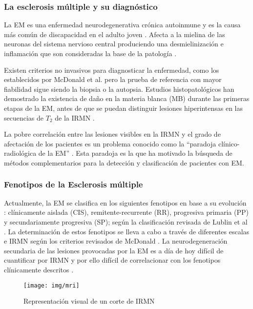 \documentclass[fleqn,12pt]{uicarticle} %
\begin{document}
\subsubsection{La esclerosis múltiple y su diagnóstico}

La EM es una enfermedad neurodegenerativa crónica autoinmune y es la causa más común de discapacidad en el adulto joven \cite{Polman2011}. Afecta a la mielina de las neuronas del sistema nervioso central produciendo una desmielinización e inflamación que son consideradas la base de la patología \cite{Br2005}.

Existen criterios no invasivos para diagnosticar la enfermedad, como los establecidos por McDonald et al.\cite{Lublin2014} pero la prueba de referencia con mayor fiabilidad sigue siendo la biopsia o la autopsia. Estudios histopatológicos han demostrado la existencia de daño en la materia blanca (MB) durante las primeras etapas de la EM, antes de que se puedan distinguir lesiones hiperintensas en las secuencias de $T_2$ de la IRMN \cite{Beer2016, Moll2011, Miller2003}.

La pobre correlación entre las lesiones visibles en la IRMN y el grado de afectación de los pacientes es un problema conocido como la “paradoja clínico-radiológica de la EM” \cite{Barkhof2002}. Esta paradoja es la que ha motivado la búsqueda de métodos complementarios para la detección y clasificación de pacientes con EM. 

\subsubsection{Fenotipos de la Esclerosis múltiple}

Actualmente, la EM se clasifica en los siguientes fenotipos en base a su evolución : clínicamente aislada (CIS), remitente-recurrente (RR), progresiva primaria (PP) y secundariamente progresiva (SP); según la clasificación revisada de Lublin et al \cite{Lublin2014}. La determinación de estos fenotipos se lleva a cabo a través de diferentes escalas e IRMN según los criterios revisados de McDonald \cite{Polman20112}. La neurodegeneración secundaria de las lesiones provocadas por la EM es a día de hoy difícil de cuantificar por IRMN y por ello difícil de correlacionar con los fenotipos clínicamente descritos \cite{Miller2003}. 

\begin{figure}[h]
	\centering
	\texttt{[image: img/mri]}
	\caption{Representación visual de un corte de IRMN}
	\label{fig:voxeles}
\end{figure}
\end{document}
